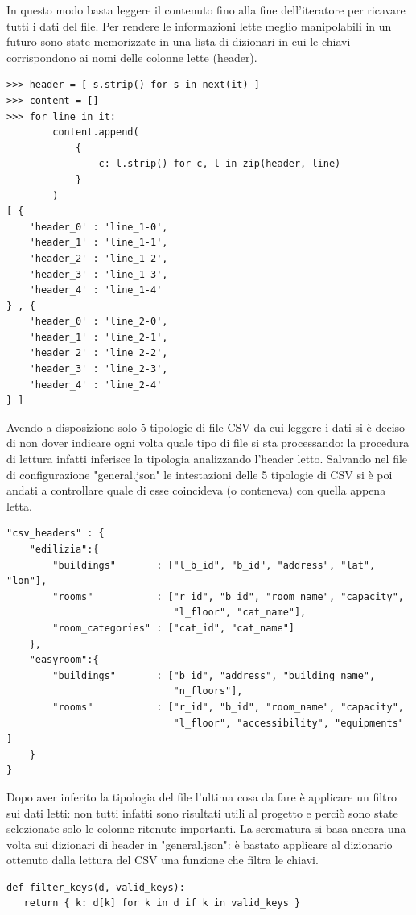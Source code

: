 \documentclass[12pt]{report}
\begin{document}
In questo modo basta leggere il contenuto fino alla fine dell'iteratore per ricavare tutti i dati del file. 
Per rendere le informazioni lette meglio manipolabili in un futuro sono state memorizzate in una lista di dizionari in cui le chiavi corrispondono ai nomi delle colonne lette (header).
\begin{lstlisting}[label=codice,caption=Memorizzazione dei dati in un dizionario, frame=single]
>>> header = [ s.strip() for s in next(it) ]
>>> content = []
>>> for line in it:
        content.append(
            {
                c: l.strip() for c, l in zip(header, line)
            }
        )
[ {
    'header_0' : 'line_1-0', 
    'header_1' : 'line_1-1', 
    'header_2' : 'line_1-2', 
    'header_3' : 'line_1-3', 
    'header_4' : 'line_1-4'
} , {
    'header_0' : 'line_2-0', 
    'header_1' : 'line_2-1', 
    'header_2' : 'line_2-2', 
    'header_3' : 'line_2-3', 
    'header_4' : 'line_2-4'
} ]
\end{lstlisting}

Avendo a disposizione solo 5 tipologie di file CSV da cui leggere i dati si è deciso di non dover indicare ogni volta quale tipo di file si sta processando: la procedura di lettura infatti inferisce la tipologia analizzando l'header letto.
Salvando nel file di configurazione "general.json" le intestazioni delle 5 tipologie di CSV si è poi andati a controllare quale di esse coincideva (o conteneva) con quella appena letta.
\begin{lstlisting}[label=codice,caption=Tipologie di header memorizzate in "'general.json'", frame=single]
"csv_headers" : {
    "edilizia":{
        "buildings"       : ["l_b_id", "b_id", "address", "lat", "lon"],
        "rooms"           : ["r_id", "b_id", "room_name", "capacity",
                             "l_floor", "cat_name"],
        "room_categories" : ["cat_id", "cat_name"]
    },
    "easyroom":{
        "buildings"       : ["b_id", "address", "building_name",
                             "n_floors"],
        "rooms"           : ["r_id", "b_id", "room_name", "capacity",
                             "l_floor", "accessibility", "equipments" ]
    }
}
\end{lstlisting}

Dopo aver inferito la tipologia del file l'ultima cosa da fare è applicare un filtro sui dati letti: non tutti infatti sono risultati utili al progetto e perciò sono state selezionate solo le colonne ritenute importanti. 
La scrematura si basa ancora una volta sui dizionari di header in "general.json": è bastato applicare al dizionario ottenuto dalla lettura del CSV una funzione che filtra le chiavi.
\begin{lstlisting}[label=codice,caption=Definizione della funzione filter\_keys, frame=single]
def filter_keys(d, valid_keys):
   return { k: d[k] for k in d if k in valid_keys }
\end{lstlisting}
\end{document}
